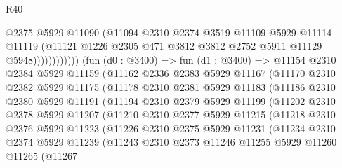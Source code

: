 \begin{lexlean}{R40}
\begin{coremodule}
                            @2375
                            @5929
                            @11090
                            (@11094
                              @2310
                              @2374
                              @3519
                              @11109
                              @5929
                              @11114
                              @11119
                              (@11121
                                @1226
                                @2305
                                @471
                                @3812
                                @3812
                                @2752
                                @5911
                                @11129
                                @5948))))))))))))
        (fun (d0 : @3400) =>
        fun (d1 : @3400) =>
        @11154
          @2310
          @2384
          @5929
          @11159
          (@11162
            @2336
            @2383
            @5929
            @11167
            (@11170
              @2310
              @2382
              @5929
              @11175
              (@11178
                @2310
                @2381
                @5929
                @11183
                (@11186
                  @2310
                  @2380
                  @5929
                  @11191
                  (@11194
                    @2310
                    @2379
                    @5929
                    @11199
                    (@11202
                      @2310
                      @2378
                      @5929
                      @11207
                      (@11210
                        @2310
                        @2377
                        @5929
                        @11215
                        (@11218
                          @2310
                          @2376
                          @5929
                          @11223
                          (@11226
                            @2310
                            @2375
                            @5929
                            @11231
                            (@11234
                              @2310
                              @2374
                              @5929
                              @11239
                              (@11243
                                @2310
                                @2373
                                @11246
                                @11255
                                @5929
                                @11260
                                @11265
                                (@11267

\end{coremodule}
\end{lexlean}

